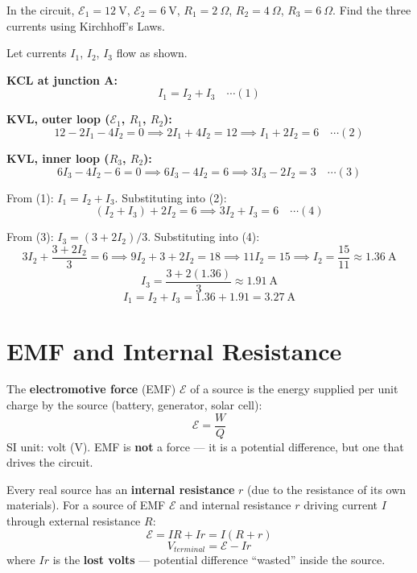 \begin{examplebox}[23.4]
In the circuit, $\mathcal{E}_1 = 12\ \text{V}$,
$\mathcal{E}_2 = 6\ \text{V}$,
$R_1 = 2\ \Omega$, $R_2 = 4\ \Omega$,
$R_3 = 6\ \Omega$. Find the three currents using
Kirchhoff's Laws.
\end{examplebox}

\begin{solutionbox}
Let currents $I_1$, $I_2$, $I_3$ flow as shown.

\textbf{KCL at junction A:}
\[
  I_1 = I_2 + I_3 \quad \cdots(1)
\]

\textbf{KVL, outer loop ($\mathcal{E}_1$, $R_1$, $R_2$):}
\[
  12 - 2I_1 - 4I_2 = 0
  \implies 2I_1 + 4I_2 = 12
  \implies I_1 + 2I_2 = 6 \quad\cdots(2)
\]

\textbf{KVL, inner loop ($R_3$, $R_2$):}
\[
  6I_3 - 4I_2 - 6 = 0
  \implies 6I_3 - 4I_2 = 6
  \implies 3I_3 - 2I_2 = 3 \quad\cdots(3)
\]

From (1): $I_1 = I_2 + I_3$. Substituting into (2):
\[
  (I_2 + I_3) + 2I_2 = 6
  \implies 3I_2 + I_3 = 6 \quad\cdots(4)
\]

From (3): $I_3 = (3 + 2I_2)/3$. Substituting into (4):
\[
  3I_2 + \frac{3 + 2I_2}{3} = 6
  \implies 9I_2 + 3 + 2I_2 = 18
  \implies 11I_2 = 15
  \implies I_2 = \frac{15}{11} \approx 1.36\ \text{A}
\]
\[
  I_3 = \frac{3 + 2(1.36)}{3}
  \approx 1.91\ \text{A}
\]
\[
  I_1 = I_2 + I_3 = 1.36 + 1.91 = 3.27\ \text{A}
\]
\end{solutionbox}

\section{EMF and Internal Resistance}

\begin{definitionbox}
The \textbf{electromotive force} (EMF) $\mathcal{E}$
of a source is the energy supplied per unit charge
by the source (battery, generator, solar cell):
\[
  \mathcal{E} = \frac{W}{Q}
\]
SI unit: volt (V). EMF is \textbf{not} a force ---
it is a potential difference, but one that drives
the circuit.

Every real source has an \textbf{internal resistance}
$r$ (due to the resistance of its own materials).
For a source of EMF $\mathcal{E}$ and internal
resistance $r$ driving current $I$ through external
resistance $R$:
\[
  \mathcal{E} = IR + Ir = I(R + r)
\]
\[
  V_{terminal} = \mathcal{E} - Ir
\]
where $Ir$ is the \textbf{lost volts} --- potential
difference ``wasted'' inside the source.
\end{definitionbox}


